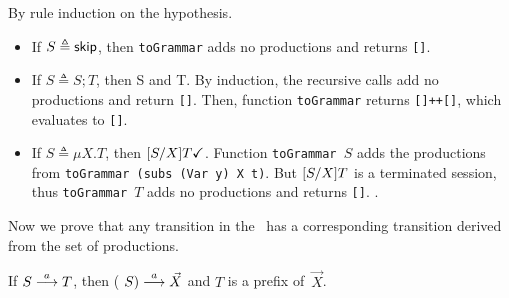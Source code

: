 \begin{itemizeproof}
  By rule induction  on the hypothesis.
  \begin{itemize}
  \item If $S\triangleq \mathsf{skip}$, then \lstinline{toGrammar} adds no
    productions and returns \lstinline{[]}.
  \item If $S\triangleq S;T$, then \DONE S and \DONE T. By induction,
    the recursive calls add no productions and return
    \lstinline|[]|. Then, function \lstinline|toGrammar| returns
    \lstinline|[]++[]|, which evaluates to \lstinline|[]|.
  \item If $S\triangleq \mu X. T$, then
    $[{S}/{X}]T \checkmark$.
    Function \lstinline|toGrammar |$S$ adds the productions from
    \lstinline|toGrammar (subs (Var y) X t)|. But $[{S}/{X}] T$ is a
    terminated session, thus \lstinline{toGrammar }$T$ adds no
    productions and returns \lstinline{[]}. .
  \end{itemize}
\end{itemizeproof}

Now we prove that any transition in the \LTS\ has a
corresponding transition derived from the set of productions.

\begin{lemma}
  If $S \stackrel{a}{\longrightarrow} T$, then ( $S)
  \stackrel{a}{\longrightarrow} \vec X$ and  $T$ is a
  prefix of~$\vec X$. 
%
\end{lemma}

